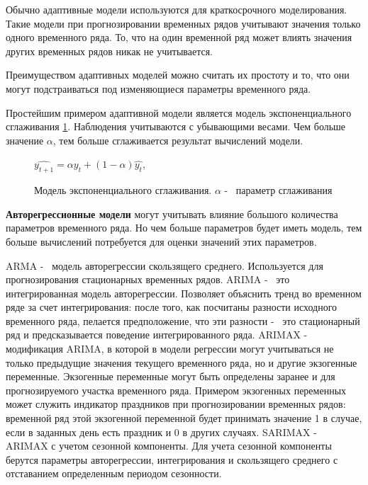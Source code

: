 Обычно адаптивные модели используются для краткосрочного моделирования.
Такие модели при прогнозировании временных рядов учитывают значения только одного временного ряда.
То, что на один временной ряд может влиять значения других временных рядов никак не учитывается.

Преимуществом адаптивных моделей можно считать их простоту и то, что они могут подстраиваться
под изменяющиеся параметры временного ряда.

Простейшим примером адаптивной модели является модель экспоненциального сглаживания \ref{img:exp_smoothing}.
Наблюдения учитываются с убывающими весами.
Чем больше значение $ \alpha $, тем больше сглаживается результат вычислений модели.

\def\figurename{Формула}
\begin{figure}[t]
	\centering
	$ \hat{y_{t+1}} = \alpha y_t + (1 - \alpha)\hat{y_t} $,
	\caption{
		Модель экспоненциального сглаживания.
		$ \alpha $ -~ параметр сглаживания
	}
	\label{img:exp_smoothing}
\end{figure}
\def\figurename{Рис.}


\textbf{Авторегрессионные модели} могут учитывать влияние большого количества параметров
временного ряда. Но чем больше параметров будет иметь модель, тем больше вычислений
потребуется для оценки значений этих параметров.

ARMA -~ модель авторегрессии скользящего среднего. Используется для прогнозирования
стационарных временных рядов.
ARIMA -~ это интегрированная модель авторегрессии. Позволяет объяснить тренд во временном
ряде за счет интегрирования: после того, как посчитаны разности исходного временного ряда,
пелается предположение, что эти разности -~ это стационарный ряд и предсказывается поведение
интегрированного ряда.
ARIMAX -~ модификация ARIMA, в которой в модели регрессии могут учитываться не только предыдущие значения
текущего временного ряда, но и другие экзогенные переменные. Экзогенные переменные могут быть определены
заранее и для прогнозируемого участка временного ряда. Примером экзогенных переменных может служить
индикатор праздников при прогнозировании временных рядов: временной ряд этой экзогенной переменной
будет принимать значение 1 в случае, если в заданных день есть праздник и 0 в других случаях.
SARIMAX -~ ARIMAX с учетом сезонной компоненты. Для учета сезонной компоненты
берутся параметры авторегрессии, интегрирования и скользящего среднего с отставанием
определенным периодом сезонности.

